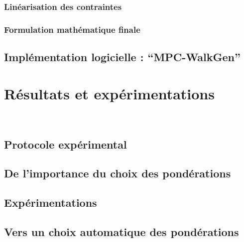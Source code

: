 		\subsubsection{Linéarisation des contraintes}
		\subsubsection{Formulation mathématique finale}
	\subsection{Implémentation logicielle : ``MPC-WalkGen''}
\section{Résultats et expérimentations}~
	\subsection{Protocole expérimental}
	\subsection{De l'importance du choix des pondérations}
	\subsection{Expérimentations}
	\subsection{Vers un choix automatique des pondérations}